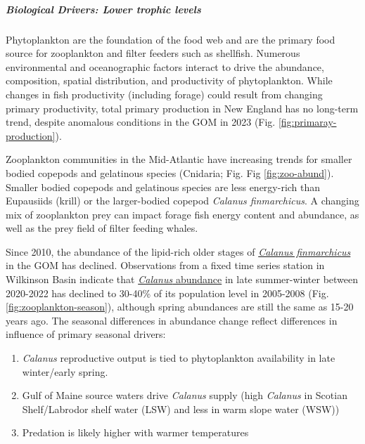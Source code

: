 \documentclass[
  10pt,
]{article}
\providecommand{\tightlist}{%
  \setlength{\itemsep}{0pt}\setlength{\parskip}{0pt}}
\begin{document}
\hypertarget{biological-drivers-lower-trophic-levels}{%
\subparagraph{Biological Drivers: Lower trophic levels}\label{biological-drivers-lower-trophic-levels}}

Phytoplankton are the foundation of the food web and are the primary food source for zooplankton and filter feeders such as shellfish. Numerous environmental and oceanographic factors interact to drive the abundance, composition, spatial distribution, and productivity of phytoplankton. While changes in fish productivity (including forage) could result from changing primary productivity, total primary production in New England has no long-term trend, despite anomalous conditions in the GOM in 2023 (Fig. \ref{fig:primaray-production}).

Zooplankton communities in the Mid-Atlantic have increasing trends for smaller bodied copepods and gelatinous
species (Cnidaria; Fig. Fig \ref{fig:zoo-abund}). Smaller bodied copepods and gelatinous species are less energy-rich than Eupausiids
(krill) or the larger-bodied copepod \emph{Calanus finmarchicus}. A changing mix of zooplankton prey can impact forage
fish energy content and abundance, as well as the prey field of filter feeding whales.

Since 2010, the abundance of the lipid-rich older stages of \href{https://noaa-edab.github.io/catalog/mesozooplankton-biomass-at-wilkson-basin.html}{\emph{Calanus finmarchicus}} in the GOM has declined. Observations from a fixed time series station in Wilkinson Basin indicate that \href{https://noaa-edab.github.io/catalog/seasonal-variation-of-calanus-finmarchicus.html}{\emph{Calanus} abundance} in late summer-winter between 2020-2022 has declined to 30-40\% of its population level in 2005-2008 (Fig. \ref{fig:zooplankton-season}), although spring abundances are still the same as 15-20 years ago. The seasonal differences in abundance change reflect differences in influence of primary seasonal drivers:

\begin{enumerate}
\def\labelenumi{\arabic{enumi}.}
\tightlist
\item
  \emph{Calanus} reproductive output is tied to phytoplankton availability in late winter/early spring.
\item
  Gulf of Maine source waters drive \emph{Calanus} supply (high \emph{Calanus} in Scotian Shelf/Labrodor shelf water (LSW) and less in warm slope water (WSW))
\item
  Predation is likely higher with warmer temperatures
\end{enumerate}
\end{document}
